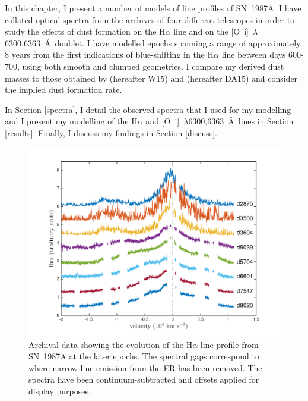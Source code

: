 In this chapter, I present a number of models of line profiles of SN~1987A. I have collated optical spectra from the archives of four different telescopes in order to study the effects of dust formation on 
the H$\alpha$ line and on the [O~{\sc i}]~$\lambda$6300,6363~\AA\ doublet.  
I have modelled epochs spanning a range of approximately 8 years from the first 
indications of blue-shifting in the H$\alpha$ line between days 600-700, using 
both smooth and clumped geometries.  I compare my derived dust masses to 
those obtained by \citet{Wesson2015} (hereafter W15) and \citet{Dwek2015} (hereafter DA15) and consider the implied dust formation rate. 

In Section \ref{spectra}, I detail the observed spectra that I used for 
my modelling and I present my modelling of the 
H$\alpha$ and [O~{\sc i}]~$\lambda$6300,6363~\AA\ lines in 
Section \ref{results}.  Finally, I discuss my findings in Section 
\ref{discuss}.
    


\begin{figure}
\centering
\includegraphics[trim =45 10 45 15,clip=true,scale=0.7]{chapters/chapter5/images/Ha_evol_late_1col.pdf}
\caption{Archival data showing the evolution of the H$\alpha$
line profile from SN~1987A at the later epochs. The spectral gaps 
correspond to where narrow line emission from the ER has been 
removed. The spectra have been continuum-subtracted and offsets applied 
for display purposes.}
\label{Ha_evol_late}
\end{figure}


